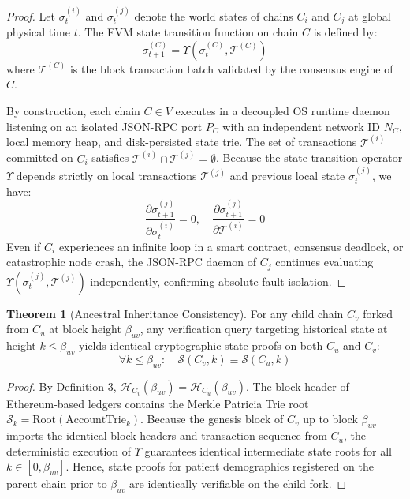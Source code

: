 \documentclass[journal]{IEEEtran}
\theoremstyle{definition}
\newtheorem{theorem}{Theorem}
\begin{document}
\begin{proof}
Let $\sigma_t^{(i)}$ and $\sigma_t^{(j)}$ denote the world states of chains $C_i$ and $C_j$ at global physical time $t$. The EVM state transition function on chain $C$ is defined by:
\begin{equation}
\sigma_{t+1}^{(C)} = \Upsilon\left(\sigma_t^{(C)}, \mathcal{T}^{(C)}\right)
\end{equation}
where $\mathcal{T}^{(C)}$ is the block transaction batch validated by the consensus engine of $C$. 

By construction, each chain $C \in V$ executes in a decoupled OS runtime daemon listening on an isolated JSON-RPC port $P_C$ with an independent network ID $N_C$, local memory heap, and disk-persisted state trie. The set of transactions $\mathcal{T}^{(i)}$ committed on $C_i$ satisfies $\mathcal{T}^{(i)} \cap \mathcal{T}^{(j)} = \emptyset$. Because the state transition operator $\Upsilon$ depends strictly on local transactions $\mathcal{T}^{(j)}$ and previous local state $\sigma_t^{(j)}$, we have:
\begin{equation}
\frac{\partial \sigma_{t+1}^{(j)}}{\partial \sigma_t^{(i)}} = 0, \quad \frac{\partial \sigma_{t+1}^{(j)}}{\partial \mathcal{T}^{(i)}} = 0
\end{equation}
Even if $C_i$ experiences an infinite loop in a smart contract, consensus deadlock, or catastrophic node crash, the JSON-RPC daemon of $C_j$ continues evaluating $\Upsilon(\sigma_t^{(j)}, \mathcal{T}^{(j)})$ independently, confirming absolute fault isolation.
\end{proof}

\begin{theorem}[Ancestral Inheritance Consistency]
\label{thm:consistency}
For any child chain $C_v$ forked from $C_u$ at block height $\beta_{uv}$, any verification query targeting historical state at height $k \le \beta_{uv}$ yields identical cryptographic state proofs on both $C_u$ and $C_v$:
\begin{equation}
\forall k \le \beta_{uv}: \quad \mathcal{S}(C_v, k) \equiv \mathcal{S}(C_u, k)
\end{equation}
\end{theorem}

\begin{proof}
By Definition 3, $\mathcal{H}_{C_v}(\beta_{uv}) = \mathcal{H}_{C_u}(\beta_{uv})$. The block header of Ethereum-based ledgers contains the Merkle Patricia Trie root $\mathcal{S}_k = \text{Root}(\text{AccountTrie}_k)$. Because the genesis block of $C_v$ up to block $\beta_{uv}$ imports the identical block headers and transaction sequence from $C_u$, the deterministic execution of $\Upsilon$ guarantees identical intermediate state roots for all $k \in [0, \beta_{uv}]$. Hence, state proofs for patient demographics registered on the parent chain prior to $\beta_{uv}$ are identically verifiable on the child fork.
\end{proof}
\end{document}
